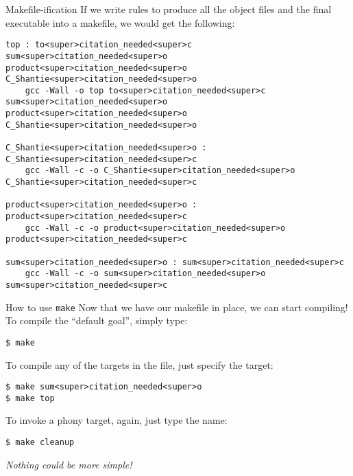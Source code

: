 \documentclass[11pt]{beamer}
\begin{document}
\begin{frame}[fragile=singleslide]{Makefile-ification}
If we write rules to produce all the object files and the final executable into a makefile, we would get the following: 
\begin{lstlisting}[style=terminal]
top : to<super>citation_needed<super>c sum<super>citation_needed<super>o product<super>citation_needed<super>o C_Shantie<super>citation_needed<super>o 
	gcc -Wall -o top to<super>citation_needed<super>c sum<super>citation_needed<super>o product<super>citation_needed<super>o C_Shantie<super>citation_needed<super>o

C_Shantie<super>citation_needed<super>o : C_Shantie<super>citation_needed<super>c
	gcc -Wall -c -o C_Shantie<super>citation_needed<super>o C_Shantie<super>citation_needed<super>c

product<super>citation_needed<super>o : product<super>citation_needed<super>c
	gcc -Wall -c -o product<super>citation_needed<super>o product<super>citation_needed<super>c

sum<super>citation_needed<super>o : sum<super>citation_needed<super>c
	gcc -Wall -c -o sum<super>citation_needed<super>o sum<super>citation_needed<super>c
\end{lstlisting}
\end{frame}

\begin{frame}[fragile=singleslide]{How to use \texttt{make}}
Now that we have our makefile in place, we can start compiling!  To compile the ``default goal'', simply type:
\begin{lstlisting}[style=terminal]
$ make
\end{lstlisting}
To compile any of the targets in the file, just specify the target:
\begin{lstlisting}[style=terminal]
$ make sum<super>citation_needed<super>o
$ make top
\end{lstlisting}
To invoke a phony target, again, just type the name:
\begin{lstlisting}[style=terminal]
$ make cleanup
\end{lstlisting}
{\center
\emph{Nothing could be more simple!}}
\end{frame}
\end{document}
